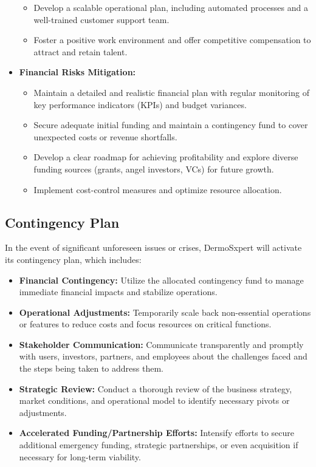 \begin{itemize}
\begin{itemize}
        \item Develop a scalable operational plan, including automated processes and a well-trained customer support team.
        \item Foster a positive work environment and offer competitive compensation to attract and retain talent.
    \end{itemize}
  \item \textbf{Financial Risks Mitigation:}
    \begin{itemize}
        \item Maintain a detailed and realistic financial plan with regular monitoring of key performance indicators (KPIs) and budget variances.
        \item Secure adequate initial funding and maintain a contingency fund to cover unexpected costs or revenue shortfalls.
        \item Develop a clear roadmap for achieving profitability and explore diverse funding sources (grants, angel investors, VCs) for future growth.
        \item Implement cost-control measures and optimize resource allocation.
    \end{itemize}
\end{itemize}

\subsection{Contingency Plan}
In the event of significant unforeseen issues or crises, DermoSxpert will activate its contingency plan, which includes:
\begin{itemize}
  \item \textbf{Financial Contingency:} Utilize the allocated contingency fund to manage immediate financial impacts and stabilize operations.
  \item \textbf{Operational Adjustments:} Temporarily scale back non-essential operations or features to reduce costs and focus resources on critical functions.
  \item \textbf{Stakeholder Communication:} Communicate transparently and promptly with users, investors, partners, and employees about the challenges faced and the steps being taken to address them.
  \item \textbf{Strategic Review:} Conduct a thorough review of the business strategy, market conditions, and operational model to identify necessary pivots or adjustments.
  \item \textbf{Accelerated Funding/Partnership Efforts:} Intensify efforts to secure additional emergency funding, strategic partnerships, or even acquisition if necessary for long-term viability.
\end{itemize}

